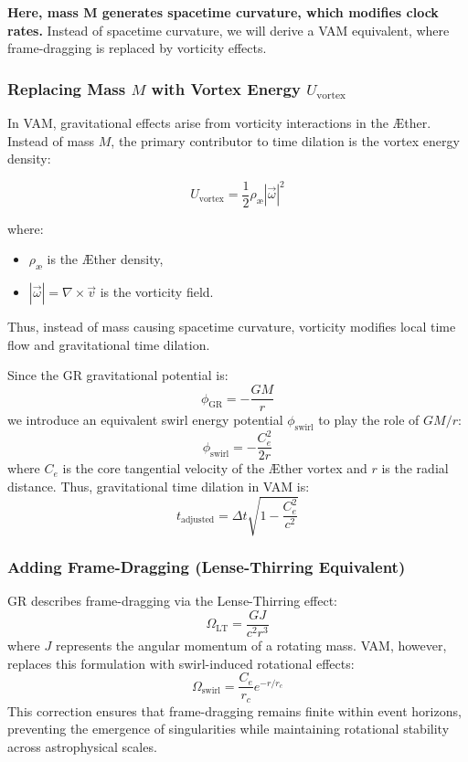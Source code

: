 \textbf{Here, mass M generates spacetime curvature, which modifies clock rates.}
Instead of spacetime curvature, we will derive a VAM equivalent, where frame-dragging is replaced by vorticity effects.

\subsubsection*{Replacing Mass $M$ with Vortex Energy $U_{\text{vortex}}$}
In VAM, gravitational effects arise from vorticity interactions in the Æther. Instead of mass $M$, the primary contributor to time dilation is the vortex energy density:


\begin{equation*}
    U_{\text{vortex}} = \frac{1}{2} \rho_\text{\ae} |\vec{\omega}|^2
\end{equation*}

where:
\begin{itemize}
    \item $\rho_\text{\ae}$ is the Æther density,
    \item $|\vec{\omega}| = \nabla \times \vec{v}$ is the vorticity field.
\end{itemize}
Thus, instead of mass causing spacetime curvature, vorticity modifies local time flow and gravitational time dilation.

Since the GR gravitational potential is:
\begin{equation*}
    \phi_{\text{GR}} = -\frac{GM}{r}
\end{equation*}
we introduce an equivalent swirl energy potential $\phi_{\text{swirl}}$ to play the role of $GM/r$:
\begin{equation*}
    \phi_{\text{swirl}} = -\frac{C_e^2}{2r}
\end{equation*}
where $C_e$ is the core tangential velocity of the Æther vortex and $r$ is the radial distance. Thus, gravitational time dilation in VAM is:
\begin{equation*}
    t_{\text{adjusted}} = \Delta t \sqrt{1 - \frac{C_e^2}{c^2}}
\end{equation*}

\subsubsection*{Adding Frame-Dragging (Lense-Thirring Equivalent)}
GR describes frame-dragging via the Lense-Thirring effect:
\begin{equation*}
    \Omega_{\text{LT}} = \frac{GJ}{c^2 r^3}
\end{equation*}
where $J$ represents the angular momentum of a rotating mass. VAM, however, replaces this formulation with swirl-induced rotational effects:
\begin{equation*}
    \Omega_{\text{swirl}} = \frac{C_e}{r_c} e^{-r/r_c}
\end{equation*}
This correction ensures that frame-dragging remains finite within event horizons, preventing the emergence of singularities while maintaining rotational stability across astrophysical scales.

